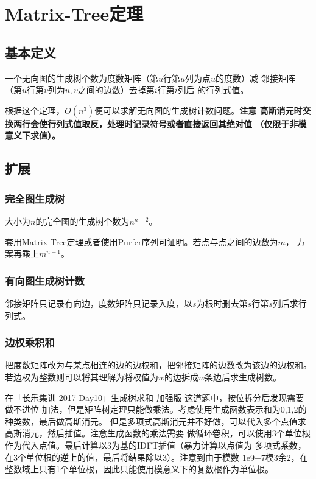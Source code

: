 \section{Matrix-Tree定理}\label{MatrixTree}
\subsection{基本定义}
\begin{theorem}
	一个无向图的生成树个数为度数矩阵（第$u$行第$u$列为点$u$的度数）减
	邻接矩阵（第$u$行第$v$列为$u,v$之间的边数）去掉第$i$行第$i$列后
	的行列式值。
\end{theorem}
根据这个定理，$O(n^3)$便可以求解无向图的生成树计数问题。{\bfseries 注意
高斯消元时交换两行会使行列式值取反，处理时记录符号或者直接返回其绝对值
（仅限于非模意义下求值）。}
\subsection{扩展}
\subsubsection{完全图生成树}
\begin{theorem}
	大小为$n$的完全图的生成树个数为$n^{n-2}$。
\end{theorem}
套用Matrix-Tree定理或者使用Purfer序列可证明。若点与点之间的边数为$m$，
方案再乘上$m^{n-1}$。
\subsubsection{有向图生成树计数}
邻接矩阵只记录有向边，度数矩阵只记录入度，以$s$为根时删去第$s$行第$s$列后求行列式。
\subsubsection{边权乘积和}
把度数矩阵改为与某点相连的边的边权和，把邻接矩阵的边数改为该边的边权和。
若边权为整数则可以将其理解为将权值为$w$的边拆成$w$条边后求生成树数。

在「长乐集训 2017 Day10」生成树求和 加强版 这道题中，按位拆分后发现需要做不进位
加法，但是矩阵树定理只能做乘法。考虑使用生成函数表示和为0,1,2的种类数，最后做高斯消元。
但是多项式高斯消元并不好做，可以代入多个点值求高斯消元，然后插值。注意生成函数的乘法需要
做循环卷积，可以使用3个单位根作为代入点值。最后计算以3为基的IDFT插值（暴力计算以点值为
多项式系数，在3个单位根的逆上的值，最后将结果除以3）。注意到由于模数
1e9+7模3余2，在整数域上只有1个单位根，因此只能使用模意义下的复数根作为单位根。

